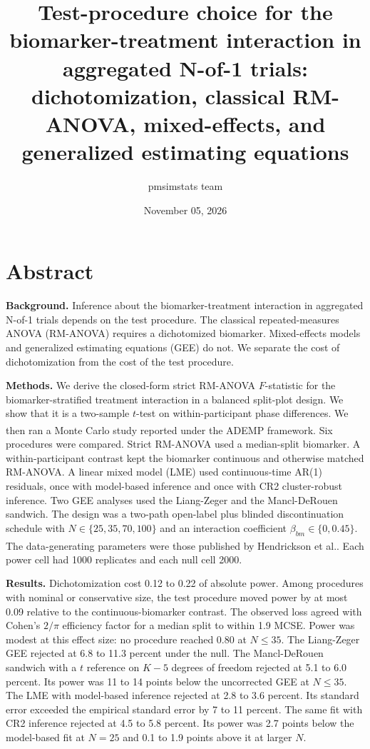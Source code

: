 \documentclass[
  11pt,
]{article}
\title{Test-procedure choice for the biomarker-treatment interaction in aggregated N-of-1 trials: dichotomization, classical RM-ANOVA, mixed-effects, and generalized estimating equations}
\author{pmsimstats team}
\date{November 05, 2026}
\begin{document}
\maketitle

{
\setcounter{tocdepth}{2}
\tableofcontents
}
\section{Abstract}\label{abstract}

\textbf{Background.} Inference about the biomarker-treatment interaction
in aggregated N-of-1 trials depends on the test procedure. The
classical repeated-measures ANOVA (RM-ANOVA) requires a dichotomized
biomarker. Mixed-effects models and generalized estimating equations
(GEE) do not. We separate the cost of dichotomization from the cost
of the test procedure.

\textbf{Methods.} We derive the closed-form strict RM-ANOVA \(F\)-statistic
for the biomarker-stratified treatment interaction in a balanced
split-plot design. We show that it is a two-sample \(t\)-test on
within-participant phase differences. We then ran a Monte Carlo
study reported under the ADEMP framework\textsuperscript{}.
Six procedures were compared. Strict RM-ANOVA used a median-split
biomarker. A within-participant contrast kept the biomarker
continuous and otherwise matched RM-ANOVA. A linear mixed model
(LME) used continuous-time AR(1) residuals, once with model-based
inference and once with CR2 cluster-robust inference. Two GEE
analyses used the Liang-Zeger and the Mancl-DeRouen sandwich. The
design was a two-path open-label plus blinded discontinuation
schedule with \(N \in \{25, 35, 70, 100\}\) and an interaction
coefficient \(\beta_{bm} \in \{0, 0.45\}\). The data-generating
parameters were those published by Hendrickson et al.\textsuperscript{}. Each power
cell had 1000 replicates and each null cell
2000.

\textbf{Results.} Dichotomization cost 0.12 to 0.22 of absolute power.
Among procedures with nominal or conservative size, the test
procedure moved power by at most 0.09 relative to the
continuous-biomarker contrast. The observed loss agreed with Cohen's
\(2/\pi\) efficiency factor for a median split to within
1.9 MCSE. Power was modest at this effect
size: no procedure reached 0.80 at \(N \le 35\). The Liang-Zeger GEE
rejected at 6.8 to 11.3 percent under the null. The
Mancl-DeRouen sandwich with a \(t\) reference on \(K - 5\) degrees of
freedom rejected at 5.1 to 6.0
percent. Its power was
11 to 14 points
below the uncorrected GEE at \(N \le 35\). The LME with model-based
inference rejected at 2.8 to 3.6 percent. Its
standard error exceeded the empirical standard error by
7 to 11
percent. The same fit with CR2 inference rejected at
4.5 to 5.8 percent. Its power was
2.7 points below the
model-based fit at \(N = 25\) and
0.1 to 1.9 points above it
at larger \(N\).
\end{document}
